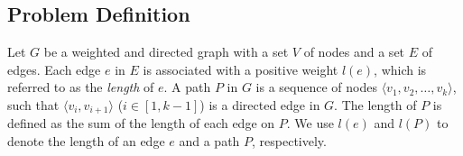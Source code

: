 \documentclass{sig-alternate}
\def\figcapup{\vspace{-2mm}}
\def\figcapdown{\vspace{-3mm}}
\def\G{G^*}
\begin{document}
\begin{sloppy}
%
%
%
%







\section{Problem Definition}\label{sec:def}


Let $G$ be a weighted and directed graph with a set $V$ of nodes and a set $E$ of edges. Each edge $e$ in $E$ is associated with a positive weight $l(e)$, which is referred to as the {\em length} of $e$. A path $P$ in $G$ is a sequence of nodes $\langle v_1, v_2, \ldots, v_k \rangle$, such that $\langle v_i, v_{i+1}\rangle$ ($i \in [1, k-1]$) is a directed edge in $G$. The length of $P$ is defined as the sum of the length of each edge on $P$. We use $l(e)$ and $l(P)$ to denote the length of an edge $e$ and a path $P$, respectively.


\end{sloppy}
\end{document}
